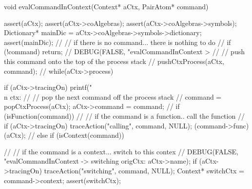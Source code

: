 void evalCommandInContext(Context* aCtx, PairAtom* command) {
  assert(aCtx);
  assert(aCtx->coAlgebras);
  assert(aCtx->coAlgebras->symbols);
  Dictionary* mainDic = aCtx->coAlgebras->symbols->dictionary;
  assert(mainDic);
  //
  // if there is no command... there is nothing to do
  //
  if (!command) return;
  //
  DEBUG(FALSE, "evalCommandInContext > %
  //
  // push this command onto the top of the process stack
  //
  pushCtxProcess(aCtx, command);
  //
  while(aCtx->process) {
    if (aCtx->tracingOn) printf("\\n ctx: %
    //
    // pop the next command off the process stack
    //
    command = popCtxProcess(aCtx);
    aCtx->command = command;
    //
    if (isFunction(command)) {
      //
      // if the command is a function.. call the function
      //
      if (aCtx->tracingOn) traceAction("calling", command, NULL);
      (command->func)(aCtx);
      //
    } else if (isContext(command)) {
      //
      // if the command is a context... switch to this contex
      //
      DEBUG(FALSE, "evalCommandInContext -> switching origCtx: %
            aCtx->name);
      if (aCtx->tracingOn) traceAction("switching", command, NULL);
      Context* switchCtx = command->context;
      assert(switchCtx);

}}}
